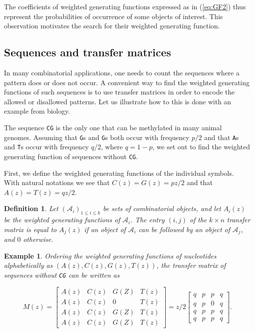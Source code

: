 \documentclass{article}
\newtheorem{definition}{Definition}
\newtheorem{example}{Example}
\begin{document}
The coefficients of weighted generating functions expressed as in
(\ref{eq:GF2}) thus represent the probabilities of occurrence of some
objects of interest. This observation motivates the search for
their weighted generating function.




\subsection{Sequences and transfer matrices}

In many combinatorial applications, one needs to count the sequences where
a pattern does or does not occur. A convenient way to find the weighted
generating functions of such sequences is to use transfer matrices in
order to encode the allowed or disallowed patterns. Let us illustrate how
to this is done with an example from biology.

The sequence \texttt{CG} is the only one that can be methylated in many
animal genomes. Assuming that \texttt{G}s and \texttt{G}s both occur with
frequency $p/2$ and that \texttt{A}s and \texttt{T}s occur with frequency
$q/2$, where $q = 1-p$, we set out to find the weighted generating
function of sequences without \texttt{CG}.

First, we define the weighted generating functions of the individual
symbols. With natural notations we see that $C(z) = G(z) = pz/2$ and that
$A(z) = T(z) = qz/2$.

\begin{definition}
\label{def:transfermat}
Let $(\mathcal{A}_i)_{1 \leq i \leq k}$ 
be sets of combinatorial objects, and let $A_i(z)$ be the
weighted generating functions of $\mathcal{A}_i$. The entry $(i,j)$ of
the $k\times n$ transfer matrix is equal to $A_j(z)$ if an object of
$\mathcal{A}_i$ can be followed by an object of $\mathcal{A}_j$, and $0$
otherwise.
\end{definition}

\begin{example}
\label{ex:CGmat}
Ordering the weighted generating functions of nucleotides alphabetically
as $(A(z), C(z), G(z), T(z))$, the transfer matrix of sequences without
\texttt{CG} can be written as

\begin{equation*}
M(z) = \left[
\begin{matrix}
A(z) & C(z) & G(Z) & T(z) \\
A(z) & C(z) &  0   & T(z) \\
A(z) & C(z) & G(Z) & T(z) \\
A(z) & C(z) & G(Z) & T(z)
\end{matrix}
\right] = z/2 \left[
\begin{matrix}
q & p & p & q \\
q & p & 0 & q \\
q & p & p & q \\
q & p & p & q
\end{matrix}
\right].
\end{equation*}
\end{example}
\end{document}
